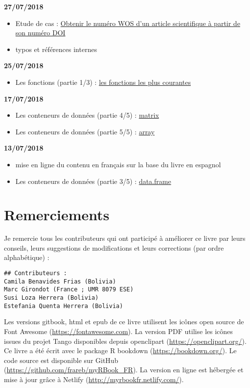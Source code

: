 \documentclass[]{book}
\providecommand{\tightlist}{%
  \setlength{\itemsep}{0pt}\setlength{\parskip}{0pt}}
\theoremstyle{definition}
\theoremstyle{definition}
\theoremstyle{definition}
\theoremstyle{remark}
\begin{document}
\textbf{27/07/2018}

\begin{itemize}
\tightlist
\item
  Etude de cas : \protect\hyperlink{studyCase002}{Obtenir le numéro WOS
  d'un article scientifique à partir de son numéro DOI}
\item
  typos et références internes
\end{itemize}

\textbf{25/07/2018}

\begin{itemize}
\tightlist
\item
  Les fonctions (partie 1/3) : \protect\hyperlink{l015mainfun}{les
  fonctions les plus courantes}
\end{itemize}

\textbf{17/07/2018}

\begin{itemize}
\tightlist
\item
  Les conteneurs de données (partie 4/5) :
  \protect\hyperlink{l014matrix}{matrix}
\item
  Les conteneurs de données (partie 5/5) :
  \protect\hyperlink{l014array}{array}
\end{itemize}

\textbf{13/07/2018}

\begin{itemize}
\tightlist
\item
  mise en ligne du contenu en français sur la base du livre en espagnol
\item
  Les conteneurs de données (partie 3/5) :
  \protect\hyperlink{l014dataframe}{data.frame}
\end{itemize}

\chapter{Remerciements}\label{remerciements}

Je remercie tous les contributeurs qui ont participé à améliorer ce
livre par leurs conseils, leurs suggestions de modifications et leurs
corrections (par ordre alphabétique) :

\begin{verbatim}
## Contributeurs :
Camila Benavides Frias (Bolivia)
Marc Girondot (France ; UMR 8079 ESE)
Susi Loza Herrera (Bolivia)
Estefania Quenta Herrera (Bolivia)
\end{verbatim}

Les versions gitbook, html et epub de ce livre utilisent les icônes open
source de Font Awesome (\url{https://fontawesome.com}). La version PDF
utilise les icônes issues du projet Tango disponibles depuis openclipart
(\url{https://openclipart.org/}). Ce livre a été écrit avec le package R
bookdown (\url{https://bookdown.org/}). Le code source est disponible
sur GitHub (\url{https://github.com/frareb/myRBook_FR}). La version en
ligne est hébergée et mise à jour grâce à Netlify
(\url{http://myrbookfr.netlify.com/}).
\end{document}
